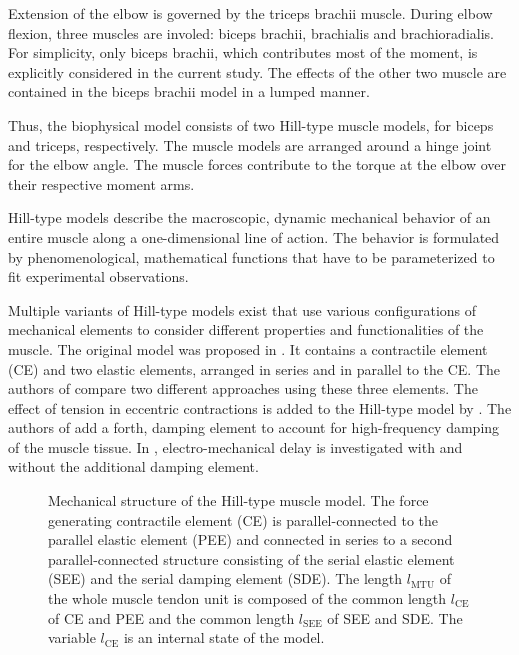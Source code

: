 Extension of the elbow is governed by the triceps brachii muscle.
During elbow flexion, three muscles are involed: biceps brachii, brachialis and brachioradialis. For simplicity, only biceps brachii, which contributes most of the moment, is explicitly considered in the current study. The effects of the other two muscle are contained in the biceps brachii model in a lumped manner.

Thus, the biophysical model consists of two Hill-type muscle models, for biceps and triceps, respectively. The muscle models are arranged around a hinge joint for the elbow angle. The muscle forces contribute to the torque at the elbow over their respective moment arms.

Hill-type models describe the macroscopic, dynamic mechanical behavior of an entire muscle along a one-dimensional line of action.
The behavior is formulated by phenomenological, mathematical functions that have to be parameterized to fit experimental observations.

Multiple variants of Hill-type models exist that use various configurations of mechanical elements to consider different properties and functionalities of the muscle. The original model was proposed in \cite{Hill1938}. It contains a contractile element (CE) and two elastic elements, arranged in series and in parallel to the CE.
The authors of \cite{Siebert2008} compare two different approaches using these three elements. The effect of tension in eccentric contractions is added to the Hill-type model by \cite{Till2008}. The authors of \cite{Gunther2007} add a forth, damping element to account for high-frequency damping of the muscle tissue. In \cite{Morl2012}, electro-mechanical delay is investigated with and without the additional damping element. 

\begin{figure}%
  \centering%
  \def\svgwidth{0.5\textwidth}
  \caption{Mechanical structure of the Hill-type muscle model. The force generating contractile element (CE) is parallel-connected to the parallel elastic element (PEE) and connected in series to a second parallel-connected structure consisting of the serial elastic element (SEE) and the serial damping element (SDE). The length $l_\text{MTU}$ of the whole muscle tendon unit is composed of the common length $l_\text{CE}$ of CE and PEE and the common length $l_\text{SEE}$ of SEE and SDE. The variable $l_\text{CE}$ is an internal state of the model.}
  \label{fig:hilltype}%
\end{figure}%

